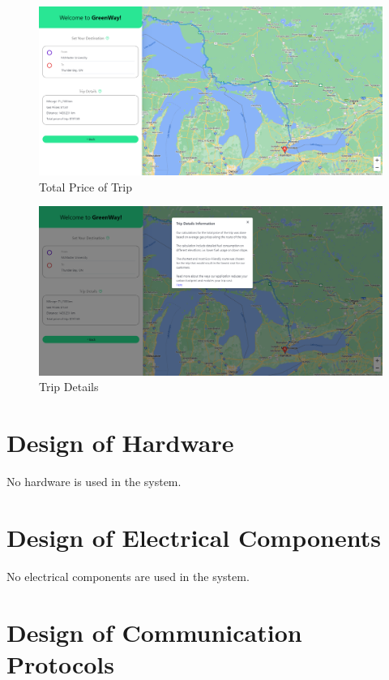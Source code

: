 \documentclass[12pt, titlepage]{article}
\begin{document}
\begin{figure}[h!]
    \centering
    \includegraphics[scale=0.36]{total-cost.PNG}
    \caption{Total Price of Trip}
\end{figure}
\begin{figure}[h!]
    \centering
    \includegraphics[scale=0.36]{trip-details.PNG}
    \caption{Trip Details}
\end{figure}

\newpage

\section{Design of Hardware}

No hardware is used in the system.

\section{Design of Electrical Components}

No electrical components are used in the system.

\section{Design of Communication Protocols}
\end{document}
